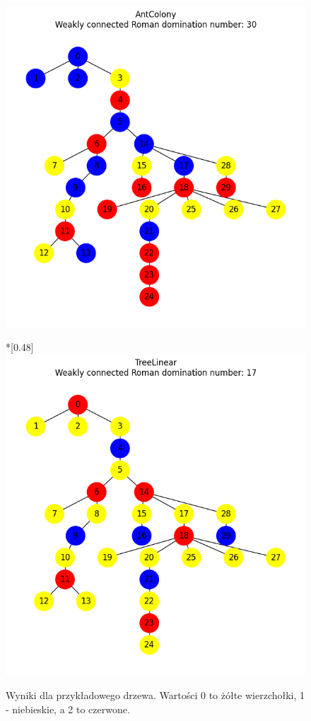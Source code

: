 \begin{figure}[H]
\begin{subcaptionbox}
            {\includegraphics[width=0.75\linewidth]{assets/plots/AntColony/RandomTree_n30_i2_results.png}}
        \end{subcaptionbox}
        \hfill
        \begin{subcaptionbox}*{}[0.48\linewidth]
            {\includegraphics[width=0.75\linewidth]{assets/plots/TreeLinear/RandomTree_n30_i2_results.png}}
        \end{subcaptionbox}
    
        \caption{Wyniki dla przykładowego drzewa. Wartości 0 to żółte wierzchołki, 1 - niebieskie, a 2 to czerwone.}
        \label{fig:tree}
    \end{figure}


